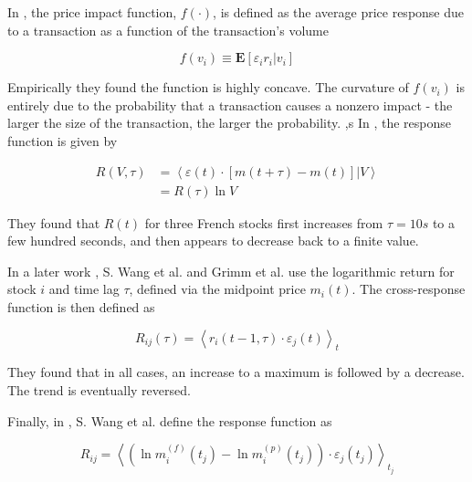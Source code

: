In \cite{theory_market_impact}, the price impact function, $f \left(\cdot\right)$,
is defined as the average price response due to a transaction as a function of the
transaction's volume

\begin{equation}\label{eq:theory_market_impact}
    f \left(v_{i}\right) \equiv \mathbf{E} \left[\varepsilon_{i} r_{i} | v_{i}\right]
\end{equation}

Empirically they found  the function is highly concave. The curvature of
$f \left(v_{i}\right)$ is entirely due to the probability that a transaction causes
a nonzero impact - the larger the size of the transaction, the larger the probability.
,s
In \cite{prop_order_book}, the response function is given by

\begin{align}\label{eq:prop_order_book}
    R \left(V, \tau\right) &= \left\langle \varepsilon \left(t\right) \cdot
    \left[m \left(t + \tau\right) - m \left(t\right)\right] |V \right\rangle \\
    &= R \left(\tau\right) \ln V
\end{align}

They found that $R \left(t\right)$ for three French stocks first increases
from $\tau = 10s$ to a few hundred seconds, and then appears to decrease back
to a finite value.

In a later work \cite{Wang_2016_cross,spread_changes_affect}, S. Wang et al. and
Grimm et al. use the logarithmic
return for stock $i$ and time lag $\tau$, defined via the midpoint price
$m_{i} \left( t \right)$. The cross-response function is then defined as

\begin{equation}\label{eq:Wang_2016}
    R_{ij}\left(\tau\right)=\left\langle r_{i}\left(t-1,\tau\right)\cdot
    \varepsilon_{j} \left(t\right) \right\rangle _{t}
\end{equation}

They found that in all cases, an increase  to a maximum is followed by a decrease. The
trend is eventually reversed.

Finally, in \cite{Wang_2018_b}, S. Wang et al. define the response function as

\begin{equation}\label{eq:Wang_2018_b}
    R_{ij} = \left\langle \left(\ln m_{i}^{\left(f\right)}\left(t_{j}\right)-
    \ln m_{i}^{\left(p\right)} \left(t_{j}\right) \right)\cdot\varepsilon_{j}
    \left(t_{j}\right)\right\rangle _{t_{j}}
\end{equation}


